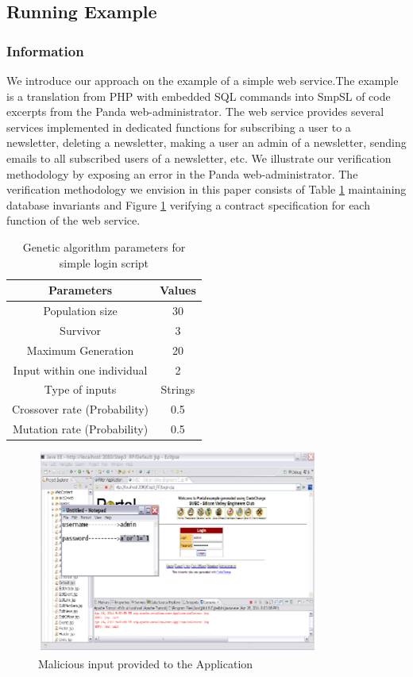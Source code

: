 \documentclass[12pt]{gji}
\begin{document}
\subsection{Running Example}

\subsubsection{Information}

We introduce our approach on the example of a simple web service.The example is a translation from PHP with embedded SQL commands into SmpSL of code excerpts from the Panda web-administrator. The web service provides several services implemented in dedicated functions for subscribing a user to a newsletter, deleting a newsletter, making a user an admin of a newsletter, sending emails to all subscribed users of a newsletter, etc. We illustrate our verification methodology by exposing an error in the Panda web-administrator. The verification methodology we envision in this paper consists of Table \ref{tab1} maintaining database invariants and Figure \ref{pic1} verifying a contract specification for each function of the web service.

\begin{table}
\caption{Genetic algorithm parameters for simple login script}
    \begin{tabular}{|c|c|}
        \hline
        Parameters  & Values \\
        \hline
        Population size  & 30 \\
        \hline
        Survivor & 3 \\
        \hline
        Maximum Generation & 20 \\
        \hline
        Input within one individual & 2 \\
        \hline
        Type of inputs & Strings \\
        \hline
        Crossover rate (Probability) & 0.5 \\
        \hline
        Mutation rate (Probability) & 0.5 \\
        \hline
    \end{tabular}
\label{tab1}
\end{table}

\begin{figure}[H]
    \centering
    \includegraphics{Picture1.png}
    \caption{Malicious input provided to the Application}
    \label{pic1}
\end{figure}
\end{document}

